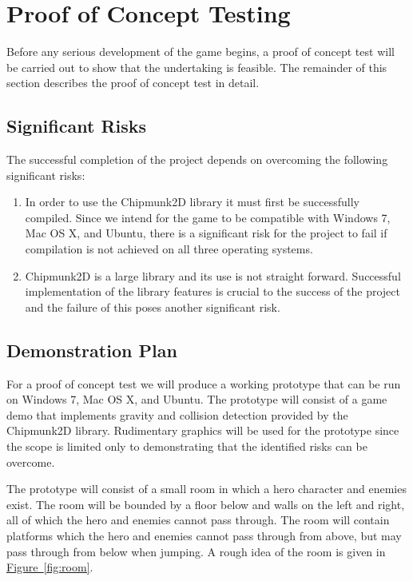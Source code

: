 \documentclass[12pt, titlepage]{article}
\begin{document}
\newpage
\section{Proof of Concept Testing}
\label{sec:poc}
Before any serious development of the game begins, a proof of concept test will be carried out to show that the undertaking is feasible.  The remainder of this section describes the proof of concept test in detail.

\subsection{Significant Risks}
The successful completion of the project depends on overcoming the following significant risks:
\begin{enumerate}
  \item In order to use the Chipmunk2D library it must first be successfully compiled.  Since we intend for the game to be compatible with Windows 7, Mac OS X, and Ubuntu, there is a significant risk for the project to fail if compilation is not achieved on all three operating systems.
  \item Chipmunk2D is a large library and its use is not straight forward.  Successful implementation of the library features is crucial to the success of the project and the failure of this poses another significant risk.
\end{enumerate}


\subsection{Demonstration Plan}

For a proof of concept test we will produce a working prototype that can be run on Windows 7, Mac OS X, and Ubuntu.  The prototype will consist of a game demo that implements gravity and collision detection provided by the Chipmunk2D library.  Rudimentary graphics will be used for the prototype since the scope is limited only to demonstrating that the identified risks can be overcome.

The prototype will consist of a small room in which a hero character and enemies exist.  The room will be bounded by a floor below and walls on the left and right, all of which the hero and enemies cannot pass through.  The room will contain platforms which the hero and enemies cannot pass through from above, but may pass through from below when jumping.  A rough idea of the room is given in \hyperref[fig:room]{Figure~\ref*{fig:room}}.
\end{document}
